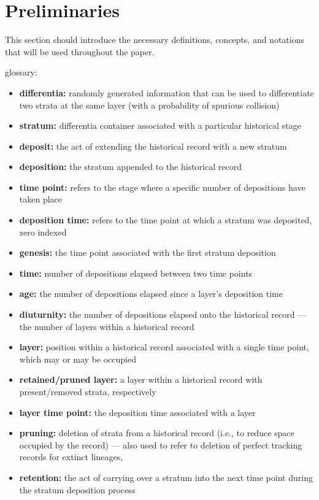\section{Preliminaries} \label{sec:methods}
This section should introduce the necessary definitions, concepts, and notations that will be used throughout the paper.

glossary:
\begin{itemize}
  \item \textbf{differentia:} randomly generated information that can be used to differentiate two strata at the same layer (with a probability of spurious collision)
  \item \textbf{stratum:} differentia container associated with a particular historical stage
  \item \textbf{deposit:} the act of extending the historical record with a new stratum
  \item \textbf{deposition:} the stratum appended to the historical record
  \item \textbf{time point:} refers to the stage where a specific number of depositions have taken place
  \item \textbf{deposition time:} refers to the time point at which a stratum was deposited, zero indexed
  \item \textbf{genesis:} the time point associated with the first stratum deposition
  \item \textbf{time:} number of depositions elapsed between two time points
  \item \textbf{age:} the number of depositions elapsed since a layer's deposition time
  \item \textbf{diuturnity:} the number of depositions elapsed onto the historical record --- the number of layers within a historical record
  \item \textbf{layer:} position within a historical record associated with a single time point, which may or may be occupied
  \item \textbf{retained/pruned layer:} a layer within a historical record with present/removed strata, respectively
  \item \textbf{layer time point:} the deposition time associated with a layer
  \item \textbf{pruning:} deletion of strata from a historical record (i.e., to reduce space occupied by the record) --- also used to refer to deletion of perfect tracking records for extinct lineages,
  \item \textbf{retention:} the act of carrying over a stratum into the next time point during the stratum deposition process

\end{itemize}
